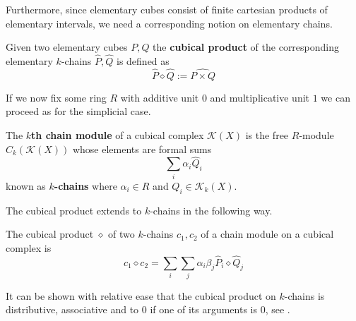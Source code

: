 \begin{example}
Furthermore, since elementary cubes consist of finite cartesian products of elementary intervals, we need a corresponding notion on elementary chains.

\begin{definition}
Given two elementary cubes $P,Q$ the \textbf{cubical product} of the corresponding elementary $k$-chains $\hat P, \hat Q$ is defined as \[\hat P \diamond \hat Q:= \widehat{P \times Q}\]
\end{definition}
If we now fix some ring $R$ with additive unit $0$ and multiplicative unit $1$ we can proceed as for the simplicial case.
\begin{definition}
  The \textbf{$k$th chain module} of a cubical complex $\mathcal{K}(X)$ is the free $R$-module $C_{k}(\mathcal{K}(X))$ whose elements are formal sums
  \[ \sum_{i} \alpha_{i} \hat Q_{i}\]
  known as \textbf{$k$-chains} where $\alpha_{i} \in R$ and $Q_{i} \in \mathcal{K}_{k}(X)$.
\end{definition}

The cubical product extends to $k$-chains in the following way.

\begin{definition}
The cubical product $\diamond$ of two $k$-chains $c_{1},c_{2}$ of a chain module on a cubical complex is \[ c_{1} \diamond c_{2} = \sum_{i} \sum_{j} \alpha_{i} \beta_{j} \hat P_{i} \diamond  \hat Q_{j}\]
\end{definition}

It can be shown with relative ease that the cubical product on $k$-chains is distributive, associative and to 0 if one of its arguments is 0, see \cite[Proposition 2.25, p. ~51]{kaczynski2004}.


\end{example}
